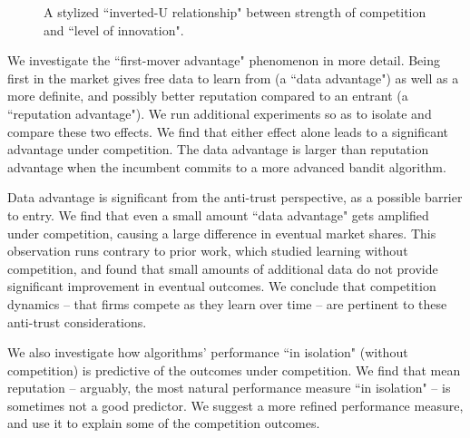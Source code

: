\documentclass[acmsmall]{ec19acm}
\theoremstyle{definition}
\newcommand{\xhdr}[1]{\vspace{1mm} \noindent{\bf #1}}
\begin{document}
\begin{wrapfigure}{r}{0.6\textwidth}
\begin{center}
 \caption{A stylized ``inverted-U relationship" between strength of competition and ``level of innovation".}
\label{fig:inverted-U}
\end{center}
\end{wrapfigure}

\xhdr{Additional findings.}
We investigate the ``first-mover advantage" phenomenon in more detail. Being first in the market gives free data to learn from (a ``data advantage") as well as a more definite, and possibly better reputation compared to an entrant (a ``reputation advantage"). We run additional experiments so as to isolate and compare these two effects. We find that either effect alone leads to a significant advantage under competition. The data advantage is larger than reputation advantage when the incumbent commits to a more advanced bandit algorithm.

Data advantage is significant from the anti-trust perspective, as a possible barrier to entry. We find that even a small amount ``data advantage" gets amplified under competition, causing a large difference in eventual market shares. This observation runs contrary to prior work,  %
which studied learning without competition, and found that small amounts of additional data do not provide significant improvement in eventual outcomes. We conclude that competition dynamics -- that firms compete as they learn over time -- are pertinent to these anti-trust considerations.

We also investigate how algorithms' performance ``in isolation" (without competition) is predictive of the outcomes under competition. We find that mean reputation -- arguably, the most natural performance measure ``in isolation" -- is sometimes not a good predictor. We suggest a
more refined performance measure, and use it to explain some of the competition outcomes.
\end{document}
